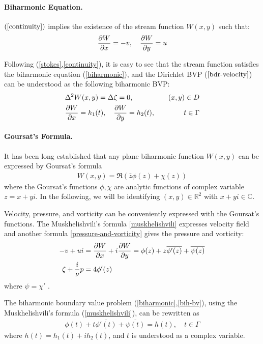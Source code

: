 \documentclass[10pt,twocolumn]{article}
\begin{document}
\paragraph*{Biharmonic Equation.} $(\ref{continuity})$ implies the existence of the stream function $W(x,y)$ such that:
\begin{align}
  \pdv{W}{x} = -v,\quad \pdv{W}{y} = u \label{stream-1}
\end{align}

Following (\ref{stokes},\ref{continuity}), it is easy to see that the stream function satisfies the biharmonic equation (\ref{biharmonic}),
and the Dirichlet BVP ($\ref{bdr-velocity}$) can be understood as 
the following biharmonic BVP:
\begin{align}
  &\Delta^2 W(x,y) = \Delta \zeta = 0, &(x,y)\in D \label{biharmonic}\\
  &\pdv{W}{x}(t) = h_1(t),\quad \pdv{W}{y}(t) = h_2(t), \quad &t\in \Gamma\label{bih-bv}
\end{align}

\paragraph*{Goursat's Formula.} It has been long established that any plane biharmonic function $W(x,y)$ can be expressed by Goursat's formula 
\begin{align}
  W(x,y) = \Re (\bar z \phi(z) + \chi (z)) \label{Goursat}
\end{align}
where the Goursat's functions $\phi, \chi$ are analytic functions of complex variable $z = x+yi$.
In the following, we will be identifying $(x,y) \in \mathbb{R}^2$ with $x + yi \in \mathbb{C}$. 

Velocity, pressure, and vorticity can be conveniently expressed with the Goursat's functions. 
The Muskhelishvili's formula \eqref{muskhelishvili} 
expresses velocity field and another formula \eqref{pressure-and-vorticity} gives the pressure and vorticity:
\begin{align}
  -v + ui &= \pdv{W}{x} + i\pdv{W}{y} 
    = \phi(z) + z \overline{\phi'(z)} + \overline{\psi(z)}
    \label{muskhelishvili}\\
   \zeta + \frac{i}{\nu}p &= 4\phi'(z) \label{pressure-and-vorticity}
\end{align} where $\psi = \chi'$ \cite{muskhelishviliBasicProblemsMathematical1977}. 

The biharmonic boundary value problem (\ref{biharmonic},\ref{bih-bv}), 
using the Muskhelishvili's formula (\ref{muskhelishvili}), can be rewritten as
\begin{align}
  \phi(t) + t\overline{\phi'(t)} + \overline{\psi(t)} 
  = h(t), \quad
  t \in \Gamma \label{musk-bvp}
\end{align} where $h(t) =  h_1(t) + ih_2(t)$,  and $t$ is understood as a complex variable. 
\end{document}
